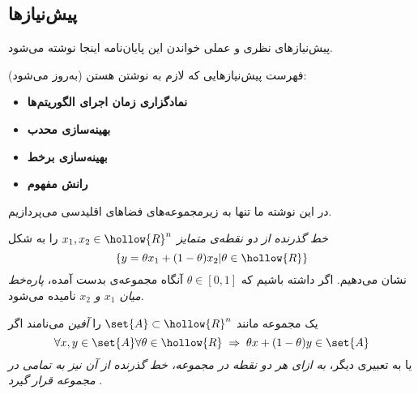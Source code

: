 \subsection{
پیش‌نیازها
}

پیش‌نیازهای نظری و عملی خواندن این پایان‌نامه اینجا نوشته می‌شود.


فهرست پیش‌نیازهایی که لازم به نوشتن هستن (به‌روز می‌شود):
\begin{itemize}
\item {\bf
نمادگزاری زمان اجرای الگوریتم‌ها
}


\item {\bf
بهینه‌سازی محدب
}

\item {\bf
بهینه‌سازی برخط
}

\item {\bf
رانش مفهوم
}

\end{itemize}












در این نوشته ما تنها به زیرمجموعه‌های فضاهای اقلیدسی می‌پردازیم.

\textit{
خط گذرنده از دو نقطه‌ی متمایز 
$x_1, x_2 \in \hollow{R}^n$} 
را به شکل
\[
\left\lbrace y = \theta x_1 + (1 - \theta ) x_2 | \theta \in \hollow{R} \right\rbrace
\]
نشان می‌دهیم. اگر داشته باشیم که 
$\theta \in [0,1]$ 
آنگاه مجموعه‌ی بدست آمده، 
\textit{
پاره‌خط میان 
$x_1$ 
و 
$x_2$} 
نامیده می‌شود.


یک مجموعه مانند 
$\set{A} \subset \hollow{R}^n$ 
را 
\textit{
آفین
} 
می‌نامند اگر
\[
\forall x,y \in \set{A} \forall \theta \in \hollow{R} \; \Rightarrow \; \theta x + (1-\theta) y \in \set{A}
\]
یا به تعبیری دیگر، 
\textit{
به ازای هر دو نقطه در مجموعه، خط گذرنده از آن نیز به تمامی در مجموعه قرار گیرد
}. 


